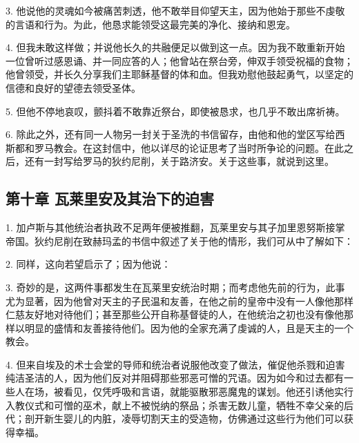 3. 他说他的灵魂如今被痛苦刺透，他不敢举目仰望天主，因为他始于那些不虔敬的言语和行为。为此，他恳求能领受这最完美的净化、接纳和恩宠。\par

4. 但我未敢这样做；并说他长久的共融便足以做到这一点。因为我不敢重新开始一位曾听过感恩诵、并一同应答的人；他曾站在祭台旁，伸双手领受祝福的食物；他曾领受，并长久分享我们主耶稣基督的体和血。但我劝慰他鼓起勇气，以坚定的信德和良好的望德去领受圣体。\par

5. 但他不停地哀叹，颤抖着不敢靠近祭台，即使被恳求，也几乎不敢出席祈祷。\par

6. 除此之外，还有同一人物另一封关于圣洗的书信留存，由他和他的堂区写给西斯都和罗马教会。在这封信中，他以详尽的论证思考了当时所争论的问题。在此之后，还有一封写给罗马的狄约尼削，关于路济安。关于这些事，就说到这里。\par


\subsection{第十章 瓦莱里安及其治下的迫害}

1. 加卢斯与其他统治者执政不足两年便被推翻，瓦莱里安与其子加里恩努斯接掌帝国。狄约尼削在致赫玛孟的书信中叙述了关于他的情形，我们可从中了解如下：\par

2. 同样，这向若望启示了；因为他说：\par

3. 奇妙的是，这两件事都发生在瓦莱里安统治时期；而考虑他先前的行为，此事尤为显著，因为他曾对天主的子民温和友善，在他之前的皇帝中没有一人像他那样仁慈友好地对待他们；甚至那些公开自称基督徒的人，在他统治之初也没有像他那样以明显的盛情和友善接待他们。因为他的全家充满了虔诚的人，且是天主的一个教会。\par

4. 但来自埃及的术士会堂的导师和统治者说服他改变了做法，催促他杀戮和迫害纯洁圣洁的人，因为他们反对并阻碍那些邪恶可憎的咒语。因为如今和过去都有一些人在场，被看见，仅凭呼吸和言语，就能驱散邪恶魔鬼的谋划。他还引诱他实行入教仪式和可憎的巫术，献上不被悦纳的祭品；杀害无数儿童，牺牲不幸父亲的后代；剖开新生婴儿的内脏，凌辱切割天主的受造物，仿佛通过这些行为他们可以获得幸福。\par

